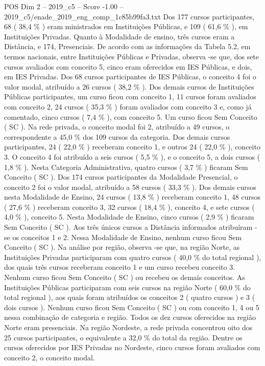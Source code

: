 \begin{textsample}{POS Dim 2 – 2019\_c5 – Score -1.00 – 2019\_c5/enade\_2019\_eng\_comp\_1c85b99fa3.txt}
Dos 177 cursos participantes, 68 ( 38,4 \% ) eram ministrados em Instituições Públicas, e 109 ( 61,6 \% ), em Instituições Privadas.
Quanto à Modalidade de ensino, três cursos eram a Distância, e 174, Presenciais.
De acordo com as informações da Tabela 5.2, em termos nacionais, entre Instituições Públicas e Privadas, observa -se que, dos sete cursos avaliados com conceito 5, cinco eram oferecidos em IES Públicas, e dois, em IES Privadas.
Dos 68 cursos participantes de IES Públicas, o conceito 4 foi o valor modal, atribuído a 26 cursos ( 38,2 \% ).
Dos demais cursos de Instituições Públicas participantes, um curso ficou com conceito 1, 11 cursos foram avaliados com conceito 2, 24 cursos ( 35,3 \% ) foram avaliados com conceito 3 e, como já comentado, cinco cursos ( 7,4 \% ), com conceito 5.
Um curso ficou Sem Conceito ( SC ).
Na rede privada, o conceito modal foi 2, atribuído a 49 cursos, o correspondente a 45,0 \% dos 109 cursos da categoria.
Dos demais cursos participantes, 24 ( 22,0 \% ) receberam conceito 1, e outros 24 ( 22,0 \% ), conceito 3.
O conceito 4 foi atribuído a seis cursos ( 5,5 \% ), e o conceito 5, a dois cursos ( 1,8 \% ).
Nesta Categoria Administrativa, quatro cursos ( 3,7 \% ) ficaram Sem Conceito ( SC ).
Dos 174 cursos participantes da Modalidade Presencial, o conceito 2 foi o valor modal, atribuído a 58 cursos ( 33,3 \% ).
Dos demais cursos nesta Modalidade de Ensino, 24 cursos ( 13,8 \% ) receberam conceito 1, 48 cursos ( 27,6 \% ) receberam conceito 3, 32 cursos ( 18,4 \% ), conceito 4, e sete cursos ( 4,0 \% ), conceito 5.
Nesta Modalidade de Ensino, cinco cursos ( 2,9 \% ) ficaram Sem Conceito ( SC ).
Aos três únicos cursos a Distância informados atribuíram -se os conceitos 1 e 2.
Nessa Modalidade de Ensino, nenhum curso ficou Sem Conceito ( SC ).
Na análise por região, observa -se que, na região Norte, as Instituições Privadas participaram com quatro cursos ( 40,0 \% do total regional ), dos quais três cursos receberam conceito 1 e um curso recebeu conceito 3.
Nenhum curso ficou Sem Conceito ( SC ) ou recebeu os demais conceitos.
As Instituições Públicas participaram com seis cursos na região Norte ( 60,0 \% do total regional ), aos quais foram atribuídos os conceitos 2 ( quatro cursos ) e 3 ( dois cursos ).
Nenhum curso ficou Sem Conceito ( SC ) ou com conceito 1, 4 ou 5 nessa combinação de categoria e região.
Todos os dez cursos oferecidos na região Norte eram presenciais.
Na região Nordeste, a rede privada concentrou oito dos 25 cursos participantes, o equivalente a 32,0 \% do total da região.
Dentre os cursos oferecidos por IES Privadas no Nordeste, cinco cursos foram avaliados com conceito 2, o conceito modal.

\end{textsample}
